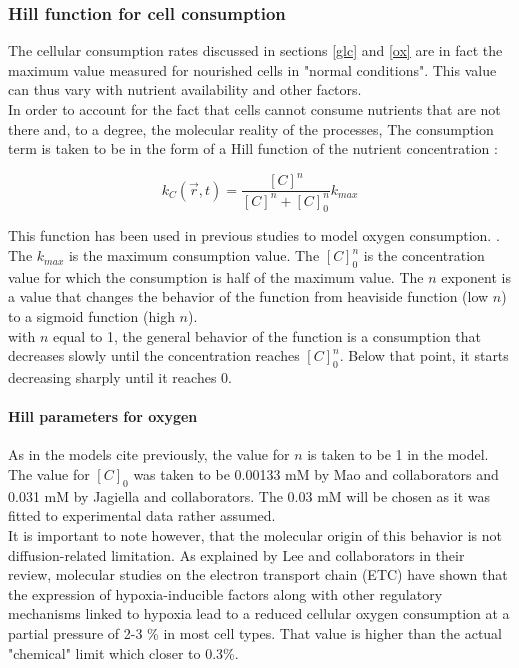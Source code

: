 \documentclass[11pt,a4paper]{article}
\begin{document}
\subsubsection{Hill function for cell consumption}
The cellular consumption rates discussed in sections \ref{glc} and \ref{ox} are in fact the maximum value measured for nourished cells in "normal conditions". This value can thus vary with nutrient availability and other factors.\\ 

In order to account for the fact that cells cannot consume nutrients that are not there and, to a degree, the molecular reality of the processes, The consumption term is taken to be in the form of a Hill function of the nutrient concentration : 

\[ k_C(\overrightarrow{r},t) = \frac{[C]^n}{[C]^n + [C]^n_{0}}k_{max}  \]

This function has been used in previous studies to model oxygen consumption. \cite{Mao2018}\cite{Kempf2015}\cite{Jagiella2016}. The $k_{max}$ is the maximum consumption value. The $[C]^n_{0}$ is the concentration value for which the consumption is half of the maximum value. The $n$  exponent is a value that changes the behavior of the function from heaviside function (low $n$) to a sigmoid function (high $n$).\\

with $n$ equal to 1, the general behavior of the function is a consumption that decreases slowly until the concentration reaches $[C]^n_{0}$. Below that point, it starts decreasing sharply until it reaches 0.

\paragraph{Hill parameters for oxygen} As in the models cite previously, the value for $n$ is taken to be 1 in the model. The value for $[C]_{0}$ was taken to be 0.00133 mM by Mao and collaborators and 0.031 mM by Jagiella and collaborators.\cite{Mao2018}\cite{Jagiella2016} The 0.03 mM will be chosen as it was fitted to experimental data rather assumed.\\

It is important to note however, that the molecular origin of this behavior is not diffusion-related limitation. As explained by Lee and collaborators in their review, molecular studies on the electron transport chain (ETC) have shown that the expression of hypoxia-inducible factors along with other regulatory mechanisms linked to hypoxia lead to a reduced cellular oxygen consumption at a partial pressure of 2-3 \% in most cell types. That value is higher than the actual "chemical" limit which closer to 0.3\%.\cite{Lee2020} 
\end{document}
